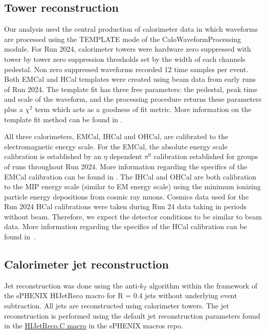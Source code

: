 \subsection{Tower reconstruction}

Our analysis used the central production of calorimeter data in which waveforms are processed using the TEMPLATE mode of the CaloWaveformProcessing module. 
For Run 2024, calorimeter towers were hardware zero suppressed with tower by tower zero suppression thresholds set by the width of each channels pedestal. 
Non zero suppressed waveforms recorded 12 time samples per event. Both EMCal and HCal templates were created using beam data from early runs of Run 2024. 
The template fit has three free parameters: the pedestal, peak time and scale of the waveform, and the processing procedure returns these parameters plus a $\chi^{2}$ term which acts as a goodness of fit metric. 
More information on the template fit method can be found in \cite{Seidlitz1}.

All three calorimeters, EMCal, IHCal and OHCal, are calibrated to the electromagnetic energy scale. 
For the EMCal, the absolute energy scale calibration is established by an $\eta$ dependent $\pi^{0}$ calibration established for groups of runs throughout Run 2024. 
More information regarding the specifics of the EMCal calibration can be found in \cite{Seidlitz1}. 
The IHCal and OHCal are both calibration to the MIP energy scale (similar to EM energy scale) using the minimum ionizing particle energy depositions from cosmic ray muons. 
Cosmics data used for the Run 2024 HCal calibrations were taken during Run 24 data taking in periods without beam. Therefore, we expect the detector conditions to be similar to beam data. More information regarding the specifics of the HCal calibration can be found in~\cite{HCal_calib_internal_note}.

\subsection{Calorimeter jet reconstruction}
Jet reconstruction was done using the anti-$k_{T}$ algorithm within the framework of the sPHENIX HIJetReco macro for R = 0.4 jets without underlying event subtraction. 
All jets are reconstructed using calorimeter towers. 
The jet reconstruction is performed using the default jet reconstruction parameters found in the \href{https://github.com/sPHENIX-Collaboration/macros/blob/master/common/HIJetReco.C}{HIJetReco.C macro} in the sPHENIX macros repo.

